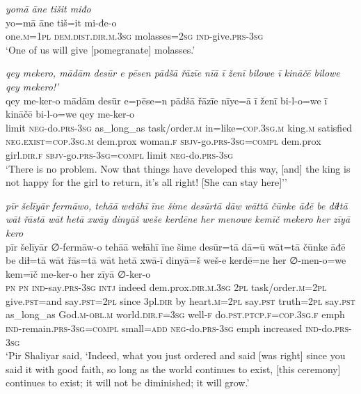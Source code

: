 \ea \label{ŽP.228}
\textit{yomā āne tišit miđo} \\ 
\gll yo=mā āne tiš=it mi-đe-o \\ 
 one\textsc{.m}\textsc{=1pl} \textsc{dem.dist}\textsc{.dir}\textsc{.m}\textsc{.3sg} molasses\textsc{=\textsc{2sg}} \textsc{ind-}give\textsc{.prs}\textsc{-3sg} \\ 
\glt `One of us will give [pomegranate] molasses.'
\z 
 
\ea \label{ŽP.242}
\textit{qey mekero, mādām desūr e pēsen pādšā řāzīe nīā ī ženī bilowe ī kināčē bilowe qey mekero!’} \\ 
\gll qey me-ker-o mādām desūr e=pēse=n pādšā řāzīe nīye=ā ī ženī bi-l-o=we ī kināčē bi-l-o=we qey me-ker-o \\ 
 limit \textsc{neg-}do\textsc{.prs}\textsc{-3sg} as\_long\_as task/order\textsc{.m} in=like\textsc{=cop}\textsc{.3sg}\textsc{.m} king\textsc{.m} satisfied \textsc{\textsc{neg.}exist}\textsc{=cop}\textsc{.3sg}\textsc{.m} dem.prox woman\textsc{.f} \textsc{sbjv-}go\textsc{.prs}\textsc{-3sg}\textsc{=compl} dem.prox girl\textsc{.dir}\textsc{.f} \textsc{sbjv-}go\textsc{.prs}\textsc{-3sg}\textsc{=compl} limit \textsc{neg-}do\textsc{.prs}\textsc{-3sg} \\ 
\glt `There is no problem. Now that things have developed this way, [and] the king is not happy for the girl to return, it’s all right! [She can stay here]’'
\z 
 
\ea \label{ŽP.243}
\textit{pīr šelīyār fermāwo, tehāā weɫāhī īne šime desūrtā dāw wāttā čūnke āđē be diɫtā wāt řāstā wāt hetā xwāy dinyāš weše kerdēne her menowe kemīč mekero her zīyā kero} \\ 
\gll pīr šelīyār ∅-fermāw-o tehāā weɫāhī īne šime desūr=tā dā=ū wāt=tā čūnke āđē be diɫ=tā wāt řās=tā wāt hetā xwā-ī dinyā=š weš-e kerdē=ne her ∅-men-o=we kem=īč me-ker-o her zīyā ∅-ker-o \\ 
 \textsc{pn} \textsc{pn} \textsc{ind-}say\textsc{.prs}\textsc{-3sg} \textsc{intj} indeed dem.prox\textsc{.dir}\textsc{.m}\textsc{.3sg} \textsc{2pl} task/order\textsc{.m}=\textsc{2pl} give\textsc{.pst}=and say\textsc{.pst}=\textsc{2pl} since 3pl\textsc{.dir} by heart\textsc{.m}=\textsc{2pl} say\textsc{.pst} truth=\textsc{2pl} say\textsc{.pst} as\_long\_as God\textsc{.m}\textsc{-obl}\textsc{.m} world\textsc{.dir}\textsc{.f}\textsc{=3sg} well\textsc{-f} do\textsc{.pst}\textsc{.ptcp}\textsc{.f}\textsc{=cop}\textsc{.3sg}\textsc{.f} emph \textsc{ind-}remain\textsc{.prs}\textsc{-3sg}\textsc{=compl} small\textsc{=add} \textsc{neg-}do\textsc{.prs}\textsc{-3sg} emph increased \textsc{ind-}do\textsc{.prs}\textsc{-3sg} \\ 
\glt `Pir Shaliyar said, ‘Indeed, what you just ordered and said [was right] since you said it with good faith, so long as the world continues to exist, [this ceremony] continues to exist; it will not be diminished; it will grow.'
\z 
 
